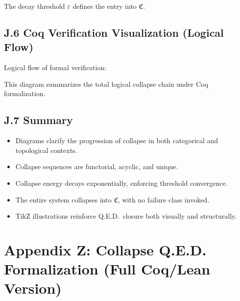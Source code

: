 \documentclass[11pt]{article}
\begin{document}
\noindent The decay threshold \( \varepsilon \) defines the entry into \( \mathfrak{C} \).

\subsection*{J.6 Coq Verification Visualization (Logical Flow)}

Logical flow of formal verification:

\begin{center}
\end{center}

\noindent This diagram summarizes the total logical collapse chain under Coq formalization.

\subsection*{J.7 Summary}

\begin{itemize}
  \item Diagrams clarify the progression of collapse in both categorical and topological contexts.
  \item Collapse sequences are functorial, acyclic, and unique.
  \item Collapse energy decays exponentially, enforcing threshold convergence.
  \item The entire system collapses into \( \mathfrak{C} \), with no failure class invoked.
  \item TikZ illustrations reinforce Q.E.D.\ closure both visually and structurally.
\end{itemize}



\appendix
\section*{Appendix Z: Collapse Q.E.D. Formalization (Full Coq/Lean Version)}
\end{document}
